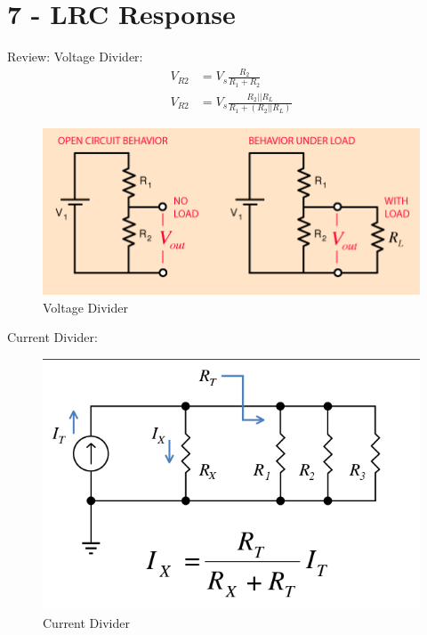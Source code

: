 \documentclass[a4paper,10pt]{report}
\begin{document}
\chapter{7 - LRC Response}
Review:
Voltage Divider:
\begin{align*}
	V_{R2} &= V_s\frac{R_2}{R_1 + R_2}\\
	V_{R2} &= V_s\frac{R_2 || R_L}{R_1 + (R_2 || R_L)}
\end{align*}
\begin{figure}[!h]
	\begin{centering}
	\begin{center}
	\includegraphics[width=\linewidth]{./voltage_divider.png}
	\caption{Voltage Divider}
	\label{fig:voltage_divider}
	\end{center}
	\par\end{centering}
\end{figure}

Current Divider:
\begin{figure}[!H]
	\begin{centering}
	\begin{center}
	\includegraphics[width=\linewidth]{./current_divider.png}
	\caption{Current Divider}
	\label{fig:current_divider}
	\end{center}
	\par\end{centering}
\end{figure}
\end{document}
